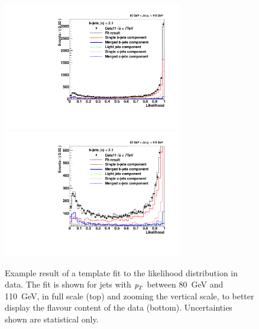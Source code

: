 \begin{figure}[tp]
\centering
\includegraphics[width=0.7\textwidth]{FIGS/Fits/LikelihoodFit_3param_ETAFull_Bin2.pdf}
\includegraphics[width=0.7\textwidth]{FIGS/Fits/LikelihoodFit_3param_ETAFull_ZOOM_Bin2.pdf}
\caption{Example result of a template fit to the likelihood distribution in data. The fit is shown for jets with ${\emph{p}_{T}}$ between  80~GeV and 110~GeV, in full scale (top) and zooming the vertical scale, to better display the flavour content of the data (bottom). Uncertainties shown are statistical only.}
\label{fig:fittemplates1}
\end{figure}

